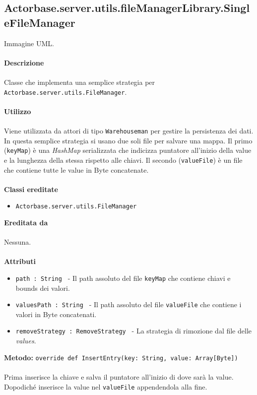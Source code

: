 \documentclass[a4paper]{article}
\begin{document}
	\subsection{Actorbase.server.utils.fileManagerLibrary.SingleFileManager}
		Immagine UML.
		\\ \\
		\textbf{Descrizione}
			\\ \\
			Classe che implementa una semplice strategia per \texttt{Actorbase.server.utils.FileManager}.
			\\ \\
		\textbf{Utilizzo}
			\\ \\
			Viene utilizzata da attori di tipo \texttt{Warehouseman} per gestire la persistenza dei dati. In questa semplice strategia si usano due soli file per salvare una mappa. Il primo (\texttt{keyMap}) è una \emph{HashMap} serializzata che indicizza puntatore all'inizio della value e la lunghezza della stessa rispetto alle chiavi. Il secondo (\texttt{valueFile}) è un file che contiene tutte le value in Byte concatenate.
			\\ \\
		\textbf{Classi ereditate}
			\begin{itemize}
			 	\item \texttt{Actorbase.server.utils.FileManager}
			\end{itemize}
		\textbf{Ereditata da}
			\\ \\
			Nessuna.
			\\ \\
		\textbf{Attributi}
			\begin{itemize}
				\item \texttt{path : String } - Il path assoluto del file \texttt{keyMap} che contiene chiavi e bounds dei valori.
				\item \texttt{valuesPath : String } - Il path assoluto del file \texttt{valueFile} che contiene i valori in Byte concatenati.
				\item \texttt{removeStrategy : RemoveStrategy } - La strategia di rimozione dal file delle \emph{values}.			
			\end{itemize}	
		\textbf{Metodo:} \texttt{override def InsertEntry(key: String, value: Array[Byte])}
		\\ \\
		Prima inserisce la chiave e salva il puntatore all'inizio di dove sarà la value. Dopodiché inserisce la value nel \texttt{valueFile} appendendola alla fine.
\end{document}
